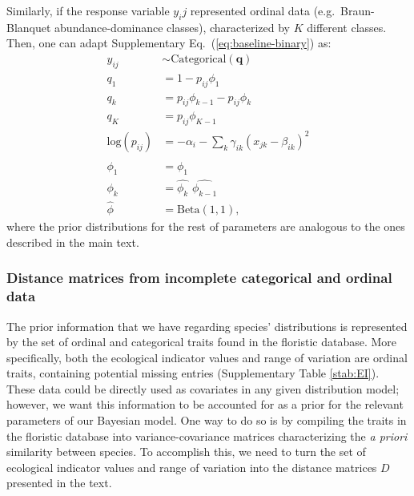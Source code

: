 \documentclass[11pt, a4paper]{article}
\begin{document}
Similarly, if the response variable $y_ij$ represented ordinal data (e.g.~Braun-Blanquet abundance-dominance classes), characterized by $K$ different classes. Then, one can adapt Supplementary Eq.~(\ref{eq:baseline-binary}) as:
\begin{equation}
\begin{split}
y_{ij} & \sim \text{Categorical}\left(\mathbf{q}\right) \\
q_{1} & = 1- p_{ij}\phi_1 \\
q_{k} & =  p_{ij}\phi_{k-1} -  p_{ij}\phi_{k} \\
q_{K} & =  p_{ij}\phi_{K-1} \\
\text{log}\left(p_{ij}\right) & = -\alpha_{i} - \sum_k \gamma_{ik} \left(x_{jk}-\beta_{ik}\right)^2 \\
\phi_1 & = \hat{\phi_1} \\
\phi_k & = \hat{\phi_k} \,\, \hat{\phi_{k-1}} \\
\hat{\phi} & = \text{Beta}(1,1),
\end{split}
\label{eq:baseline-categorical}
\end{equation}
where the prior distributions for the rest of parameters are analogous to the ones described in the main text.

\subsubsection*{Distance matrices from incomplete categorical and ordinal data}
The prior information that we have regarding species' distributions is represented by the set of ordinal and categorical traits found in the floristic database. More specifically, both the ecological indicator values and range of variation are ordinal traits, containing potential missing entries (Supplementary Table \ref{stab:EI}). These data could be directly used as covariates in any given distribution model; however, we want this information to be accounted for as a prior for the relevant parameters of our Bayesian model. One way to do so is by compiling the traits in the floristic database into variance-covariance matrices characterizing the \textit{a priori} similarity between species. To accomplish this, we need to turn the set of ecological indicator values and range of variation into the distance matrices $D$ presented in the text.
\end{document}
